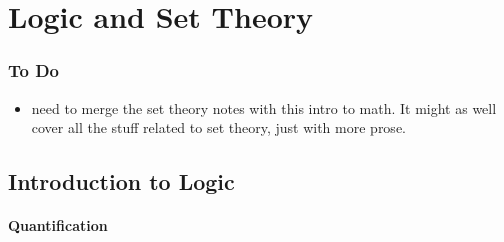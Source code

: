 \documentclass{book}
\begin{document}
	
	
	
	
	
	
	
	
	
	\newpage
	\part{Logic and Set Theory}
	\section{To Do}
	\begin{itemize}
		\item need to merge the set theory notes with this intro to math. It might as well cover all the stuff related to set theory, just with more prose. 
	\end{itemize}
	
	\chapter{Introduction to Logic}
	
	\subsection{Quantification}
	
\end{document}
